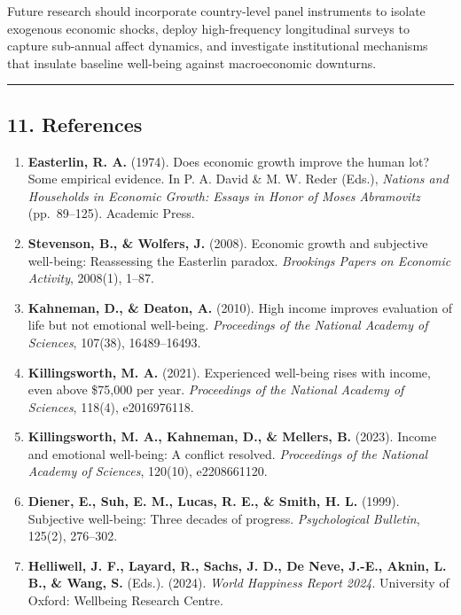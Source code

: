 \documentclass[
]{article}
\providecommand{\tightlist}{%
  \setlength{\itemsep}{0pt}\setlength{\parskip}{0pt}}
\begin{document}
Future research should incorporate country-level panel instruments to
isolate exogenous economic shocks, deploy high-frequency longitudinal
surveys to capture sub-annual affect dynamics, and investigate
institutional mechanisms that insulate baseline well-being against
macroeconomic downturns.

\begin{center}\rule{0.5\linewidth}{0.5pt}\end{center}

\hypertarget{references}{%
\subsection{11. References}\label{references}}

\begin{enumerate}
\def\labelenumi{\arabic{enumi}.}
\tightlist
\item
  \textbf{Easterlin, R. A.} (1974). Does economic growth improve the
  human lot? Some empirical evidence. In P. A. David \& M. W. Reder
  (Eds.), \emph{Nations and Households in Economic Growth: Essays in
  Honor of Moses Abramovitz} (pp.~89--125). Academic Press.
\item
  \textbf{Stevenson, B., \& Wolfers, J.} (2008). Economic growth and
  subjective well-being: Reassessing the Easterlin paradox.
  \emph{Brookings Papers on Economic Activity}, 2008(1), 1--87.
\item
  \textbf{Kahneman, D., \& Deaton, A.} (2010). High income improves
  evaluation of life but not emotional well-being. \emph{Proceedings of
  the National Academy of Sciences}, 107(38), 16489--16493.
\item
  \textbf{Killingsworth, M. A.} (2021). Experienced well-being rises
  with income, even above \$75,000 per year. \emph{Proceedings of the
  National Academy of Sciences}, 118(4), e2016976118.
\item
  \textbf{Killingsworth, M. A., Kahneman, D., \& Mellers, B.} (2023).
  Income and emotional well-being: A conflict resolved.
  \emph{Proceedings of the National Academy of Sciences}, 120(10),
  e2208661120.
\item
  \textbf{Diener, E., Suh, E. M., Lucas, R. E., \& Smith, H. L.} (1999).
  Subjective well-being: Three decades of progress. \emph{Psychological
  Bulletin}, 125(2), 276--302.
\item
  \textbf{Helliwell, J. F., Layard, R., Sachs, J. D., De Neve, J.-E.,
  Aknin, L. B., \& Wang, S.} (Eds.). (2024). \emph{World Happiness
  Report 2024}. University of Oxford: Wellbeing Research Centre.
\end{enumerate}
\end{document}
